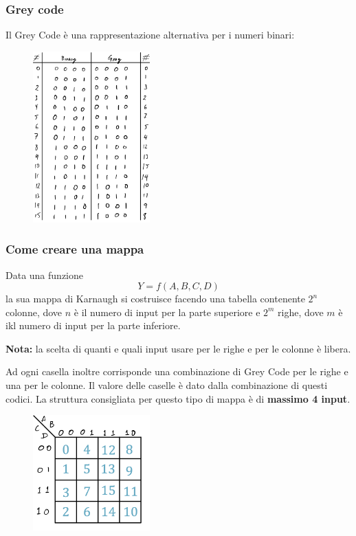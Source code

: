 \documentclass[../main.tex]{subfiles}
\begin{document}
\subsubsection{Grey code}
Il Grey Code è una rappresentazione alternativa per i numeri binari:
\begin{figure}[h]
    \centering
    \includegraphics[width=0.4\textwidth]{images/grayCode.png}
\end{figure}

\subsubsection{Come creare una mappa}
Data una funzione
$$
    Y = f(A, B, C, D)
$$
la sua mappa di Karnaugh si costruisce facendo una tabella contenente $2^n$ colonne, dove $n$ è il numero di input per la parte superiore
e $2^m$ righe, dove $m$ è ikl numero di input per la parte inferiore.

\textbf{Nota:} la scelta di quanti e quali input usare per le righe e per le colonne è libera.

Ad ogni casella inoltre corrisponde una combinazione di Grey Code per le righe e una per le colonne. Il valore delle caselle è dato
dalla combinazione di questi codici. La struttura consigliata per questo tipo di mappa è di \textbf{massimo 4 input}.
\begin{figure}[h]
    \centering
    \includegraphics[width=0.4\textwidth]{images/karnaugh.png}
\end{figure}
\end{document}
